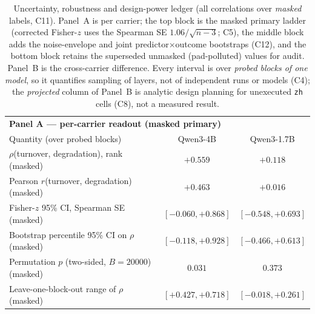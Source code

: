 \begin{table}[t]
\centering
\caption{Uncertainty, robustness and design-power ledger (all correlations over \emph{masked}
labels, C11). Panel~A is per carrier; the top block is the masked primary ladder (corrected
Fisher-$z$ uses the Spearman SE $1.06/\sqrt{n-3}$; C5), the middle block adds the
noise-envelope and joint predictor$\times$outcome bootstraps (C12), and the bottom block retains
the superseded unmasked (pad-polluted) values for audit. Panel~B is the cross-carrier
difference. Every interval is over \emph{probed blocks of one model}, so it quantifies sampling
of layers, not of independent runs or models (C4); the \emph{projected} column of Panel~B is
analytic design planning for unexecuted \texttt{zh} cells (C8), not a measured result.}
\label{tab:uncertainty-ledger}
\setlength{\tabcolsep}{5pt}
{\footnotesize
\begin{tabular}{lcc}
\toprule
\multicolumn{3}{l}{\textbf{Panel A --- per-carrier readout (masked primary)}} \\
Quantity (over probed blocks) & Qwen3-4B & Qwen3-1.7B \\
\midrule
$\rho$(turnover, degradation), rank (masked)      & $+0.559$            & $+0.118$ \\
Pearson $r$(turnover, degradation) (masked)       & $+0.463$            & $+0.016$ \\
Fisher-$z$ 95\% CI, Spearman SE (masked)          & $[-0.060,+0.868]$   & $[-0.548,+0.693]$ \\
Bootstrap percentile 95\% CI on $\rho$ (masked)   & $[-0.118,+0.928]$   & $[-0.466,+0.613]$ \\
Permutation $p$ (two-sided, $B{=}20000$) (masked) & $0.031$             & $0.373$ \\
Leave-one-block-out range of $\rho$ (masked)      & $[+0.427,+0.718]$   & $[-0.018,+0.261]$ \\

\end{tabular}}
\end{table}
